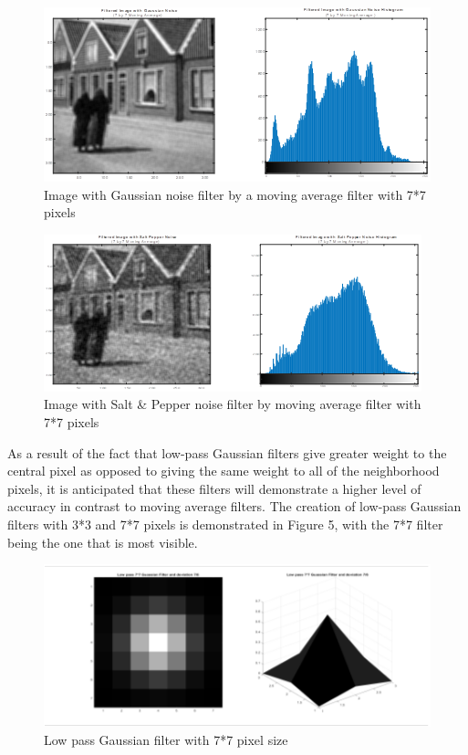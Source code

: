\begin{figure} [ht]
    \centering
    \includegraphics[scale = 1, angle=0]{Resources/Image with Gaussian noise filter by a moving average filter.png}
    \caption{Image with Gaussian noise filter by a moving average filter with 7*7 pixels}
    \label{fig:ApplyingFilters}
\end{figure}

\newpage

\begin{figure} [ht]
    \centering
    \includegraphics[scale = 1, angle=0]{Resources/Image with Salt & Pepper noise filter by moving average filter.png}
    \caption{Image with Salt \& Pepper noise filter by moving average filter with 7*7 pixels}
    \label{fig:ApplyingFilters}
\end{figure}

As a result of the fact that low-pass Gaussian filters give greater weight to the central pixel as opposed to giving the same weight to all of the neighborhood pixels, it is anticipated that these filters will demonstrate a higher level of accuracy in contrast to moving average filters. The creation of low-pass Gaussian filters with 3*3 and 7*7 pixels is demonstrated in Figure 5, with the 7*7 filter being the one that is most visible.

\begin{figure} [ht]
    \centering
    \includegraphics[scale = 1, angle=0]{Resources/Low pass Gaussian filter.png}
    \caption{Low pass Gaussian filter with 7*7 pixel size}
    \label{fig:ApplyingFilters}
\end{figure}

